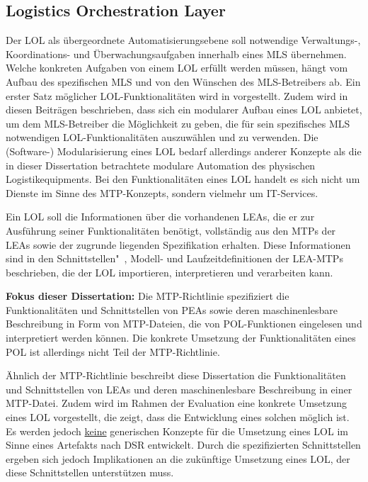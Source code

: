 \subsection{Logistics Orchestration Layer}
\label{subsec:AnforderungenLOL}

Der LOL als übergeordnete Automatisierungsebene soll notwendige Verwaltungs-, Koordinations- und Überwachungsaufgaben innerhalb eines MLS übernehmen. Welche konkreten Aufgaben von einem LOL erfüllt werden müssen, hängt vom Aufbau des spezifischen MLS und von den Wünschen des MLS-Betreibers ab. Ein erster Satz möglicher LOL-Funktionalitäten wird in \cite{Blumenstein.AutomationLOL.DE,Blumenstein.MoProLog} vorgestellt. Zudem wird in diesen Beiträgen beschrieben, dass sich ein modularer Aufbau eines LOL anbietet, um dem MLS-Betreiber die Möglichkeit zu geben, die für sein spezifisches MLS notwendigen LOL-Funktionalitäten auszuwählen und zu verwenden. Die (Software-) Modularisierung eines LOL bedarf allerdings anderer Konzepte als die in dieser Dissertation betrachtete modulare Automation des physischen Logistikequipments. Bei den Funktionalitäten eines LOL handelt es sich nicht um Dienste im Sinne des MTP-Konzepts, sondern vielmehr um IT-Services.

Ein LOL soll die Informationen über die vorhandenen LEAs, die er zur Ausführung seiner Funktionalitäten benötigt, vollständig aus den MTPs der LEAs sowie der zugrunde liegenden Spezifikation erhalten. Diese Informationen sind in den Schnittstellen"~, Modell- und Laufzeitdefinitionen der LEA-MTPs beschrieben, die der LOL importieren, interpretieren und verarbeiten kann. 

\begin{graybox}
	\textbf{Fokus dieser Dissertation:} Die MTP-Richtlinie spezifiziert die Funktionalitäten und Schnittstellen von PEAs sowie deren maschinenlesbare Beschreibung in Form von MTP-Dateien, die von POL-Funktionen eingelesen und interpretiert werden können. Die konkrete Umsetzung der Funktionalitäten eines POL ist allerdings nicht Teil der MTP-Richtlinie. 
	
	Ähnlich der MTP-Richtlinie beschreibt diese Dissertation die Funktionalitäten und Schnittstellen von LEAs und deren maschinenlesbare Beschreibung in einer MTP-Datei. Zudem wird im Rahmen der Evaluation eine konkrete Umsetzung eines LOL vorgestellt, die zeigt, dass die Entwicklung eines solchen möglich ist. Es werden jedoch \underline{keine} generischen Konzepte für die Umsetzung eines LOL im Sinne eines Artefakts nach DSR entwickelt. Durch die spezifizierten Schnittstellen ergeben sich jedoch Implikationen an die zukünftige Umsetzung eines LOL, der diese Schnittstellen unterstützen muss.
\end{graybox}
